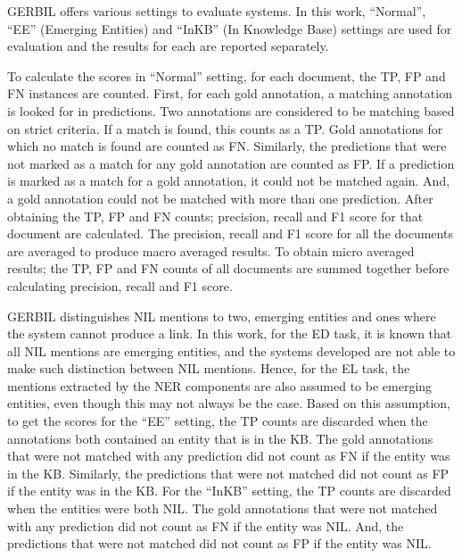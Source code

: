 \documentclass{report}
\theoremstyle{definition}
\theoremstyle{remark}
\begin{document}
GERBIL offers various settings to evaluate systems. In this work, ``Normal'', ``EE'' (Emerging Entities) and ``InKB'' (In Knowledge Base) settings are used for evaluation and the results for each are reported separately. 

To calculate the scores in ``Normal'' setting, for each document, the TP, FP and FN instances are counted. First, for each gold annotation, a matching annotation is looked for in predictions. Two annotations are considered to be matching based on strict criteria. If a match is found, this counts as a TP. Gold annotations for which no match is found are counted as FN. Similarly, the predictions that were not marked as a match for any gold annotation are counted as FP. If a prediction is marked as a match for a gold annotation, it could not be matched again. And, a gold annotation could not be matched with more than one prediction. After obtaining the TP, FP and FN counts; precision, recall and F1 score for that document are calculated. The precision, recall and F1 score for all the documents are averaged to produce macro averaged results. To obtain micro averaged results; the TP, FP and FN counts of all documents are summed together before calculating precision, recall and F1 score. 

GERBIL distinguishes NIL mentions to two, emerging entities and ones where the system cannot produce a link. In this work, for the ED task, it is known that all NIL mentions are emerging entities, and the systems developed are not able to make such distinction between NIL mentions. Hence, for the EL task, the mentions extracted by the NER components are also assumed to be emerging entities, even though this may not always be the case. Based on this assumption, to get the scores for the ``EE'' setting, the TP counts are discarded when the annotations both contained an entity that is in the KB. The gold annotations that were not matched with any prediction did not count as FN if the entity was in the KB. Similarly, the predictions that were not matched did not count as FP if the entity was in the KB. For the ``InKB'' setting, the TP counts are discarded when the entities were both NIL. The gold annotations that were not matched with any prediction did not count as FN if the entity was NIL. And, the predictions that were not matched did not count as FP if the entity was NIL.
\end{document}
